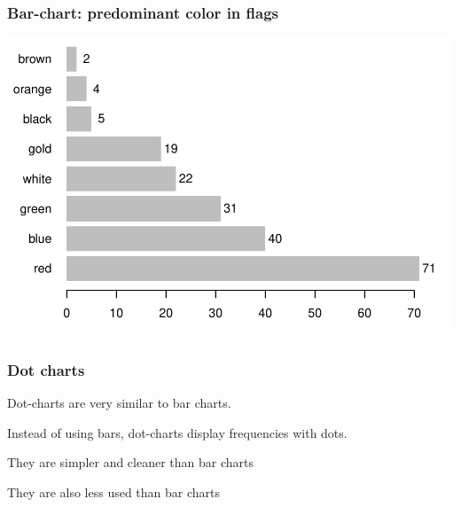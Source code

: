 \documentclass[12pt]{beamer}\usepackage[]{graphicx}\usepackage[]{color}
\newenvironment{knitrout}{}{} %
\begin{document}

\begin{frame}[fragile]
\frametitle{Bar-chart: predominant color in flags}

\begin{knitrout}\footnotesize
{}\color{fgcolor}

{\centering \includegraphics[width=.8\linewidth,height=.6\linewidth]{figure/unnamed-chunk-8-1} 

}



\end{knitrout}

\end{frame}


\begin{frame}
\begin{center}
\Huge{}
\end{center}
\end{frame}


\begin{frame}
\frametitle{Dot charts}
\bbi
  \item Dot-charts are very similar to bar charts.
  \item Instead of using bars, dot-charts display frequencies with dots.
  \item They are simpler and cleaner than bar charts
  \item They are also less used than bar charts
\ei
\end{frame}
\end{document}
